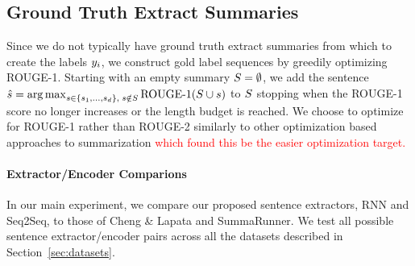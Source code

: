 \subsection{Ground Truth Extract Summaries}
Since we do not typically have ground truth extract summaries from which to
create the labels $\slabel_i$, we construct gold label sequences 
by greedily optimizing ROUGE-1. Starting with an empty summary $\summary = 
\null \emptyset$, we add the sentence $\hat{\sent} = 
{\argmax}_{ \sent \in \{\sent_1, \ldots, \sent_{\docsize}\},
\; \sent \notin \summary} \operatorname{ROUGE-1}(\summary \cup \sent)$
to $S$ stopping when the ROUGE-1 score no longer increases or the 
length budget is reached. We choose to optimize for ROUGE-1 rather than 
ROUGE-2 similarly to other optimization based approaches to summarization 
\textcolor{red}{
\cite{durrett2016learning,sipos2012large,nallapati2017summarunner} which found this
be the easier optimization target.}






\paragraph{Extractor/Encoder Comparions}{
In our main experiment, we compare our proposed 
sentence extractors, RNN and Seq2Seq,
to those of Cheng \& Lapata and SummaRunner.
We test all possible sentence extractor/encoder pairs across all the datasets
described in Section~\ref{sec:datasets}.} 


